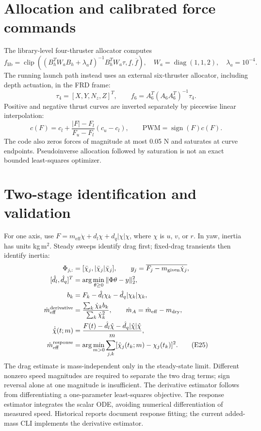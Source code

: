\documentclass[11pt,a4paper]{article}
\newcommand{\diag}{\operatorname{diag}}
\newcommand{\clip}{\operatorname{clip}}
\begin{document}
\section{Allocation and calibrated force commands}
The library-level four-thruster allocator computes
\begin{equation}
f_{\mathrm{lib}}=\clip\left((B_h^TW_aB_h+\lambda_a I)^{-1}B_h^TW_a\tau,
\underline f,\overline f\right),\quad
W_a=\diag(1,1,2),\quad\lambda_a=10^{-4}.\tag{E22}
\end{equation}
The running launch path instead uses an external six-thruster allocator,
including depth actuation, in the FRD frame:
\begin{equation}
\tau_4=[X,Y,N_z,Z]^T,\qquad
f_6=A_6^T(A_6A_6^T)^{-1}\tau_4.\tag{E23}
\end{equation}
Positive and negative thrust curves are inverted separately by piecewise
linear interpolation:
\begin{equation}
c(F)=c_l+\frac{|F|-F_l}{F_u-F_l}(c_u-c_l),\qquad
\mathrm{PWM}=\operatorname{sign}(F)c(F).\tag{E24}
\end{equation}
The code also zeros forces of magnitude at most 0.05 N and saturates at curve
endpoints. Pseudoinverse allocation followed by saturation is not an exact
bounded least-squares optimizer.

\section{Two-stage identification and validation}
For one axis, use $F=m_{\mathrm{eff}}\dot\chi+d_l\chi+d_q|\chi|\chi$,
where $\chi$ is $u$, $v$, or $r$. In yaw, inertia has units kg\,m$^2$.
Steady sweeps identify drag first; fixed-drag transients then identify inertia:
\begin{align}
\Phi_{j,:}&=[\bar\chi_j,|\bar\chi_j|\bar\chi_j],\qquad
y_j=\overline{F_j-m_{\mathrm{given}}\dot\chi_j},\notag\\
[\hat d_l,\hat d_q]^T&=\arg\min_{\theta\ge0}\|\Phi\theta-y\|_2^2,\notag\\
b_k&=F_k-\hat d_l\chi_k-\hat d_q|\chi_k|\chi_k,\notag\\
\hat m_{\mathrm{eff}}^{\mathrm{derivative}}
&=\frac{\sum_k\dot\chi_kb_k}{\sum_k\dot\chi_k^2},\qquad
\hat m_A=\hat m_{\mathrm{eff}}-m_{\mathrm{dry}},\notag\\
\dot{\hat\chi}(t;m)&=\frac{F(t)-\hat d_l\hat\chi-\hat d_q|\hat\chi|\hat\chi}{m},\notag\\
\hat m_{\mathrm{eff}}^{\mathrm{response}}
&=\arg\min_{m>0}\sum_{j,k}[\hat\chi_j(t_k;m)-\chi_j(t_k)]^2.\tag{E25}
\end{align}
The drag estimate is mass-independent only in the steady-state limit.
Different nonzero speed magnitudes are required to separate the two drag
terms; sign reversal alone at one magnitude is insufficient.
The derivative estimator follows from differentiating a one-parameter
least-squares objective. The response estimator integrates the scalar ODE,
avoiding numerical differentiation of measured speed. Historical reports
document response fitting; the current added-mass CLI implements the
derivative estimator.
\end{document}
